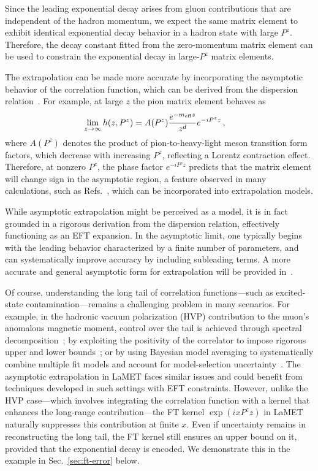 \documentclass[prd,twocolumn,superscriptaddress,preprintnumbers,showpacs,nofootinbib,notitlepage,floatfix]{revtex4-2}
\DeclareRobustCommand{\sec}[1]{Sec.~\ref{sec:#1}}
\begin{document}
Since the leading exponential decay arises from gluon contributions that are independent of the hadron momentum, we expect the same matrix element to exhibit identical exponential decay behavior in a hadron state with large $P^z$. Therefore, the decay constant fitted from the zero-momentum matrix element can be used to constrain the exponential decay in large-$P^z$ matrix elements. 

The extrapolation can be made more accurate by incorporating the asymptotic behavior of the correlation function, which can be derived from the dispersion relation~\cite{Gao:2021dbh}. For example, at large $z$ the pion matrix element behaves as
\begin{align}\label{eq:asym}
    \lim_{z\to\infty}h(z, P^z) &= A(P^z) {e^{-m_{\rm eff} z}\over z^d} e^{-iP^zz}\,,
\end{align}
where $A(P^z)$ denotes the product of pion-to-heavy-light meson transition form factors, which decrease with increasing $P^z$, reflecting a Lorentz contraction effect. Therefore, at nonzero $P^z$, the phase factor $e^{-iP^z z}$ predicts that the matrix element will change sign in the asymptotic region, a feature observed in many calculations, such as Refs.~\cite{Dutrieux:2025jed,LatticeParton:2022xsd}, which can be incorporated into extrapolation models. 

While asymptotic extrapolation might be perceived as a model, it is in fact grounded in a rigorous derivation from the dispersion relation, effectively functioning as an EFT expansion. In the asymptotic limit, one typically begins with the leading behavior characterized by a finite number of parameters, and can systematically improve accuracy by including subleading terms. A more accurate and general asymptotic form for extrapolation will be provided in~\cite{Ji:2026vir}. 

Of course, understanding the long tail of correlation functions—such as excited-state contamination—remains a challenging problem in many scenarios. For example, in the hadronic vacuum polarization (HVP) contribution to the muon’s anomalous magnetic moment, control over the tail is achieved through spectral decomposition~\cite{DellaMorte:2017dyu}; by exploiting the positivity of the correlator to impose rigorous upper and lower bounds~\cite{Borsanyi:2016lpl,Budapest-Marseille-Wuppertal:2017okr,RBC:2018dos,Gerardin:2019rua,Djukanovic:2024cmq}; or by using Bayesian model averaging to systematically combine multiple fit models and account for model-selection uncertainty~\cite{Jay:2020jkz,MILC:2024ryz,FermilabLatticeHPQCD:2024ppc}. The asymptotic extrapolation in LaMET faces similar issues and could benefit from techniques developed in such settings with EFT constraints. However, unlike the HVP case---which involves integrating the correlation function with a kernel that enhances the long-range contribution---the FT kernel $\exp(ixP^z z)$ in LaMET naturally suppresses this contribution at finite $x$. Even if uncertainty remains in reconstructing the long tail, the FT kernel still ensures an upper bound on it, provided that the exponential decay is encoded. We demonstrate this in the example in \sec{ft-error} below.
\end{document}
